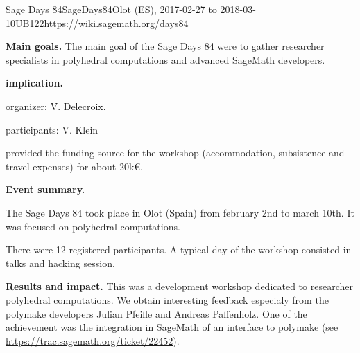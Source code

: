 \begin{event}{Sage Days 84}{SageDays84}{Olot (ES),
2017-02-27 to 2018-03-10}{UB}{12}{2}{https://wiki.sagemath.org/days84}

\textbf{Main goals.}
The main goal of the Sage Days 84 were to
gather researcher specialists in polyhedral computations and advanced
SageMath developers.

\textbf{\ODK implication.}

\ODK organizer: V. Delecroix.

\ODK participants: V. Klein

\ODK provided the funding source for the workshop (accommodation,
subsistence and travel expenses) for about 20k\euro.

\textbf{Event summary.}

The Sage Days 84 took place in Olot (Spain) from february 2nd to
march 10th. It was focused on polyhedral computations.

There were 12 registered participants. A typical day of the workshop
consisted in talks and hacking session.

\textbf{Results and impact.}
This was a development workshop dedicated to researcher polyhedral
computations. We obtain interesting feedback especialy from
the polymake developers Julian Pfeifle and Andreas Paffenholz. One
of the achievement was the integration in SageMath of an interface
to polymake
(see \url{https://trac.sagemath.org/ticket/22452}).
\end{event}
